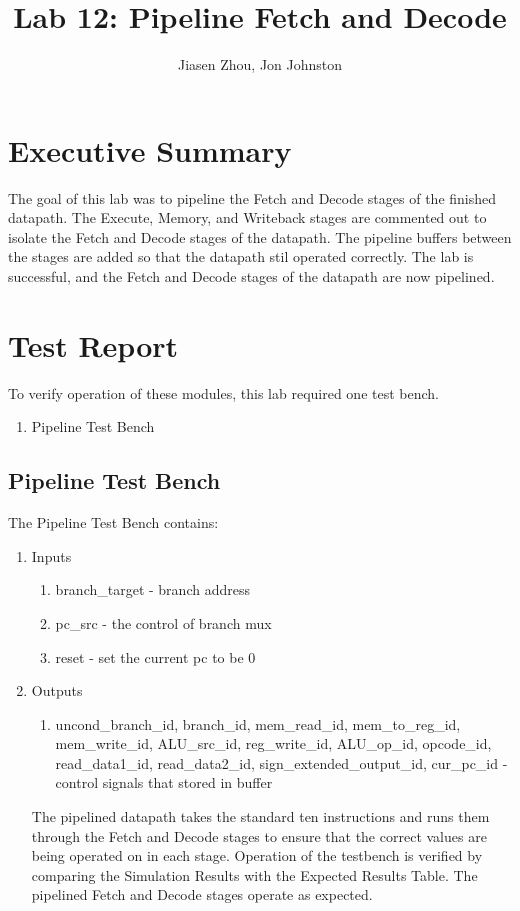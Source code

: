 \documentclass{article}
\author{Jiasen Zhou, Jon Johnston}
\title{Lab 12: Pipeline Fetch and Decode}
\begin{document}
\maketitle

\section{Executive Summary}
The goal of this lab was to pipeline the Fetch and Decode stages of the finished datapath. The Execute, Memory, and Writeback stages are commented out to isolate the Fetch and Decode stages of the datapath. The pipeline buffers between the stages are added so that the datapath stil operated correctly. The lab is successful, and the Fetch and Decode stages of the datapath are now pipelined.

\section{Test Report}
To verify operation of these modules, this lab required one test bench. 
\begin{enumerate}
	\item Pipeline Test Bench
\end{enumerate}

\subsection{Pipeline Test Bench}
The Pipeline Test Bench contains:
\begin{enumerate}
	\item Inputs
	\begin{enumerate}
		\item branch\_target - branch address
		\item pc\_src - the control of branch mux
		\item reset - set the current pc to be 0
										
	\end{enumerate}	
	\item Outputs
	\begin{enumerate}	
		\item uncond\_branch\_id, branch\_id, mem\_read\_id, mem\_to\_reg\_id, mem\_write\_id, ALU\_src\_id, reg\_write\_id, ALU\_op\_id, opcode\_id, read\_data1\_id, read\_data2\_id, sign\_extended\_output\_id, cur\_pc\_id  - control signals that stored in buffer 
	\end{enumerate}		
		
		The pipelined datapath takes the standard ten instructions and runs them through the Fetch and Decode stages to ensure that the correct values are being operated on in each stage. Operation of the testbench
		is verified by comparing the Simulation Results with the Expected Results Table. The pipelined Fetch and Decode stages operate as expected.

\end{enumerate} 
\end{document}
